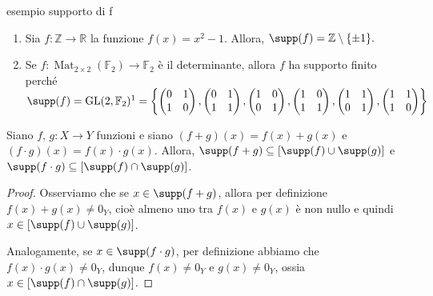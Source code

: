\begin{example}[]{esempio supporto di f}
\begin{enumerate}
\item Sia $f\colon \mathbb{Z}\to\mathbb{R}$ la funzione $f(x)=x^2-1$. Allora, $\supp(f)=\mathbb{Z}\setminus\{\pm 1\}.$
\item Se $f\colon \operatorname{Mat}_{2\times 2}(\mathbb{F}_2)\to \mathbb{F}_2$ è il determinante, 
allora $f$ ha supporto finito perché $\supp(f)=\mathrm{GL}(2,\mathbb{F}_2)\footnotemark = 
\left\{ 
  \begin{pmatrix} 0 & 1 \\ 1 & 0 \end{pmatrix}, 
  \begin{pmatrix} 0 & 1 \\ 1 & 1 \end{pmatrix}, 
  \begin{pmatrix} 1 & 0 \\ 0 & 1 \end{pmatrix}, 
  \begin{pmatrix} 1 & 0 \\ 1 & 1 \end{pmatrix}, 
  \begin{pmatrix} 1 & 1 \\ 0 & 1 \end{pmatrix}, 
  \begin{pmatrix} 1 & 1 \\ 1 & 0 \end{pmatrix} \right\} $
\end{enumerate}
\end{example}


\begin{prop}[1.2.1]{} 
Siano $f,\,g\colon X\to Y$ funzioni e siano $(f+g)(x)=f(x)+g(x)$ e $(f\cdot g)(x)=f(x)\cdot g(x)$. Allora, $\supp(f+g)\subseteq [\supp(f)\cup \supp(g)]$ e $\supp(f\cdot g)\subseteq [\supp(f)\cap \supp(g)]$. \end{prop}
\vspace{-4mm}
\begin{proof}
Osserviamo che se $x\in \supp(f+g)$, allora per definizione $f(x)+g(x)\neq 0_Y$, cioè almeno uno tra $f(x)$ e $g(x)$ è non nullo e quindi $x\in [\supp(f)\cup \supp(g)]$. 

\noindent Analogamente, se $x\in \supp(f\cdot g)$, per definizione abbiamo che $f(x)\cdot g(x)\neq 0_Y$, dunque $f(x)\neq 0_Y$ e $g(x)\neq 0_Y$, ossia $x\in [\supp(f)\cap \supp(g)]$.
\end{proof}

